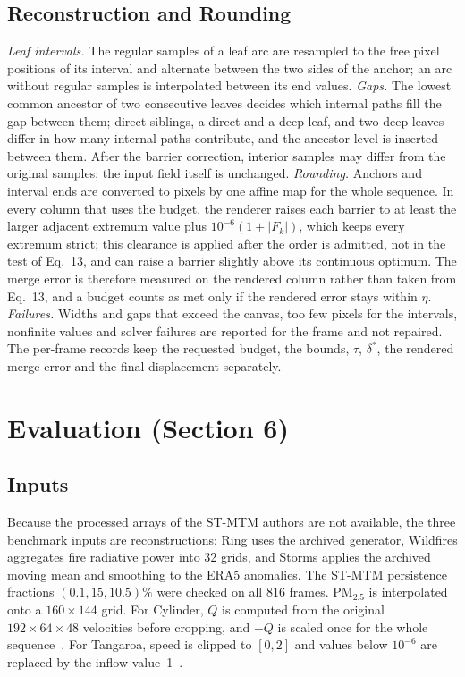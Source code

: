 \documentclass[preprint]{vgtc}
\begin{document}
\subsection{Reconstruction and Rounding}
\emph{Leaf intervals.} The regular samples of a leaf arc are resampled to the free pixel positions of its interval and alternate between the two sides of the anchor; an arc without regular samples is interpolated between its end values.
\emph{Gaps.} The lowest common ancestor of two consecutive leaves decides which internal paths fill the gap between them; direct siblings, a direct and a deep leaf, and two deep leaves differ in how many internal paths contribute, and the ancestor level is inserted between them. After the barrier correction, interior samples may differ from the original samples; the input field itself is unchanged.
\emph{Rounding.} Anchors and interval ends are converted to pixels by one affine map for the whole sequence. In every column that uses the budget, the renderer raises each barrier to at least the larger adjacent extremum value plus $10^{-6}(1+|F_k|)$, which keeps every extremum strict; this clearance is applied after the order is admitted, not in the test of Eq.~13, and can raise a barrier slightly above its continuous optimum. The merge error is therefore measured on the rendered column rather than taken from Eq.~13, and a budget counts as met only if the rendered error stays within $\eta$.
\emph{Failures.} Widths and gaps that exceed the canvas, too few pixels for the intervals, nonfinite values and solver failures are reported for the frame and not repaired. The per-frame records keep the requested budget, the bounds, $\tau$, $\delta^*$, the rendered merge error and the final displacement separately.

\section{Evaluation (Section 6)}\label{sec:evaluation}
\subsection{Inputs}
Because the processed arrays of the ST-MTM authors are not available, the three benchmark inputs are reconstructions: Ring uses the archived generator, Wildfires aggregates fire radiative power into 32 grids, and Storms applies the archived moving mean and smoothing to the ERA5 anomalies. The ST-MTM persistence fractions $(0.1,15,10.5)\%$ were checked on all 816 frames. PM$_{2.5}$ is interpolated onto a $160\times144$ grid. For Cylinder, $Q$ is computed from the original $192\times64\times48$ velocities before cropping, and $-Q$ is scaled once for the whole sequence~\cite{Camarri:2005:Cylinder,Weinkauf:SquareCylinder}. For Tangaroa, speed is clipped to $[0,2]$ and values below $10^{-6}$ are replaced by the inflow value~1~\cite{Popinet:2004:Tangaroa}.
\end{document}
